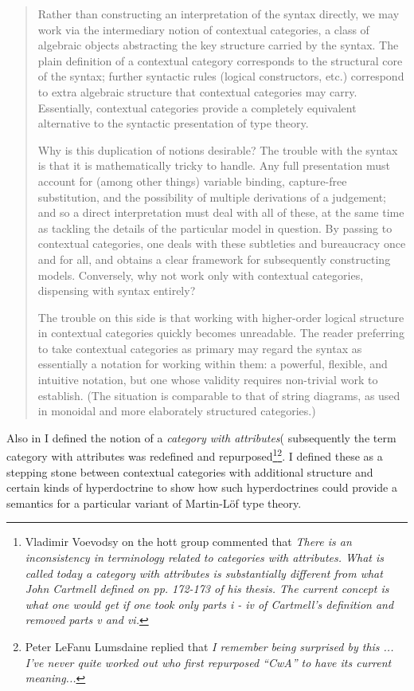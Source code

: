 \documentclass[14pt,a4paper]{scrartcl}
\begin{document}
\begin{quote}
Rather than constructing an interpretation of the syntax directly, we may work via the intermediary notion of contextual categories, a class of algebraic objects abstracting the key structure carried by the syntax. The plain definition of a contextual category corresponds to the structural core of the syntax; further syntactic rules (logical constructors, etc.) correspond to extra algebraic structure that contextual categories may carry. Essentially, contextual categories provide a completely equivalent alternative to the syntactic presentation of type theory.

Why is this duplication of notions desirable? The trouble with the syntax is that it is mathematically tricky to handle. Any full presentation must account for (among other things) variable binding, capture-free substitution, and the possibility of multiple derivations of a judgement; and so a direct interpretation must deal with all of these, at the same time as tackling the details of the particular model in question. By passing to contextual categories, one deals with these subtleties and bureaucracy once and for all, and obtains a clear framework for subsequently constructing models. Conversely, why not work only with contextual categories, dispensing with syntax entirely?

The trouble on this side is that working with higher-order logical structure in contextual categories quickly becomes unreadable. The reader preferring to take contextual categories as primary may regard the syntax as essentially a notation for working within them: a powerful, flexible, and intuitive notation, but one whose validity requires non-trivial work to establish. (The situation is comparable to that of string diagrams, as used in monoidal and more elaborately structured categories.)
\end{quote}

\noindent
Also in \cite{Cartmell78} I defined the notion of a \textit{category with attributes}(
subsequently the term category with attributes was redefined and repurposed\footnote{Vladimir Voevodsy on the hott group commented 
that \textit {There is an inconsistency in terminology related to categories with attributes. 
What is called today a category with attributes is substantially different from what John Cartmell defined on pp. 172-173 of his thesis. The current concept is what one would get if one took only parts i - iv of Cartmell's definition and removed parts v and vi.}}\footnote{Peter LeFanu Lumsdaine replied that \textit{
I remember being surprised  by this ... I’ve never quite worked out who first repurposed “CwA” to have its current meaning...}}.
I defined these as a stepping stone between contextual categories with additional structure and certain kinds of hyperdoctrine to show how such hyperdoctrines could provide a semantics for
a particular variant of Martin-L\"of type theory.  
\end{document}
